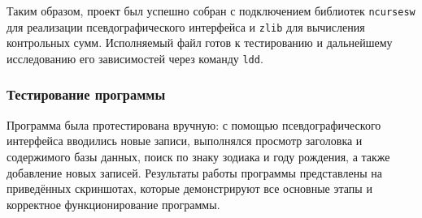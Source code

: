 
Таким образом, проект был успешно собран с подключением библиотек \texttt{ncursesw} для реализации псевдографического интерфейса и \texttt{zlib} для вычисления контрольных сумм. Исполняемый файл готов к тестированию и дальнейшему исследованию его зависимостей через команду \texttt{ldd}.

\subsubsection{Тестирование программы}

Программа была протестирована вручную: с помощью псевдографического интерфейса вводились новые записи, выполнялся просмотр заголовка и содержимого базы данных, поиск по знаку зодиака и году рождения, а также добавление новых записей. Результаты работы программы представлены на приведённых скриншотах, которые демонстрируют все основные этапы и корректное функционирование программы.

